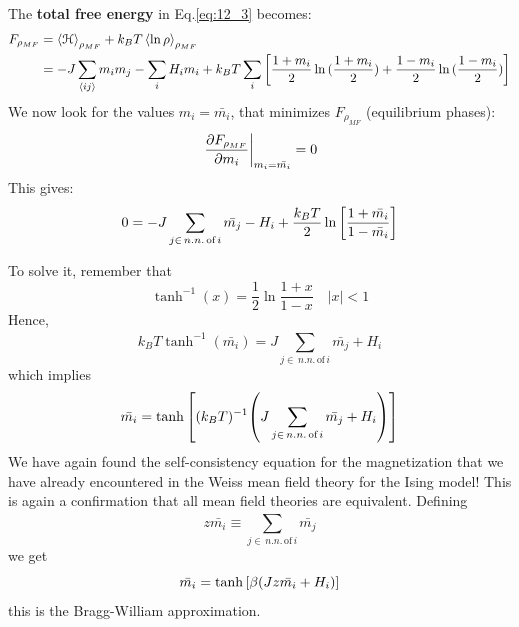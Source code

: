 \documentclass[../../Main/Main.tex]{subfiles}
\begin{document}
The \textbf{total free energy} in Eq.\eqref{eq:12_3} becomes:
\begin{equation}
\begin{split}
  F_{\rho _{MF}} &= \expval{\mathcal{H}}_{\rho _{MF}} + k_B T \expval{\ln{\rho } }_{\rho _{MF}} \\
  & = - J \sum_{\expval{ij} }^{} m_i m_j - \sum_{i}^{} H_i m_i
  + k_B T   \sum_{i}^{} \qty[ \frac{1+m_i}{2} \ln{(\frac{1+m_i}{2})} + \frac{1-m_i}{2} \ln{(\frac{1-m_i}{2})} ]
\end{split}
\end{equation}
We now look for the values \( m_i = \bar{m_i}  \), that minimizes \( F_{\rho _{MF}} \) (equilibrium phases):
\begin{equation*}
 \eval{ \pdv{F_{\rho _{MF}} }{m_i} }_{m_i = \bar{m_i} } = 0
\end{equation*}
This gives:
\begin{equation*}
  0 = - J \sum_{j \in \, n.n. \,\text{of}\, i}^{} \bar{m_j} - H_i + \frac{k_B T}{2} \ln{\qty[\frac{1+\bar{m_i} }{1- \bar{m_i} }] }
\end{equation*}

To solve it, remember that
\begin{equation*}
  \tanh^{-1} (x) = \frac{1}{2} \ln{\frac{1+x}{1-x}} \quad |x| < 1
\end{equation*}
Hence,
\begin{equation*}
  k_B T \tanh^{-1} ( \bar{m_i} ) = J \sum_{j \in \, n.n. \,\text{of}\, i}^{} \bar{m_j} + H_i
\end{equation*}
which implies
\begin{equation*}
  \bar{m_i} = \tanh \qty[(k_B T)^{-1} \qty(J \sum_{j \in \, n.n. \,\text{of}\, i}^{} \bar{m_j} + H_i ) ]
\end{equation*}
We have again found the self-consistency equation for the magnetization that we have already encountered in the Weiss mean field theory for the Ising model! This is again a confirmation that all mean field theories are equivalent.
Defining
\begin{equation*}
  z \bar{m_i} \equiv  \sum_{j \in \, n.n. \,\text{of}\, i}^{} \bar{m_j}
\end{equation*}
we get
\begin{equation}
  \bar{m_i} = \tanh \qty[\beta \qty(Jz \bar{m_i} +H_i) ]
\end{equation}
this is the Bragg-William approximation.
\end{document}
